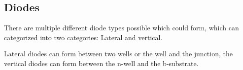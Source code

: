 \subsection{Diodes}
There are multiple different diode types possible which could form, which can categorized into two categories: Lateral and vertical.

Lateral diodes can form between two wells or the well and the junction, the vertical diodes can form between the n-well and the b-substrate.